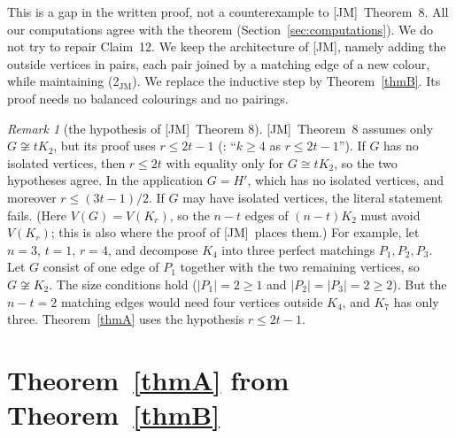 \documentclass[11pt]{amsart}
\theoremstyle{definition}
\theoremstyle{remark}
\newtheorem{remark}[theorem]{Remark}
\newcommand{\JM}{\textup{[JM]}}
\begin{document}
This is a gap in the written proof, not a counterexample to \JM\ Theorem~8. All our
computations agree with the theorem (Section~\ref{sec:computations}). We do not try to repair
Claim~12. We keep the architecture of \JM, namely adding the outside vertices in pairs, each
pair joined by a matching edge of a new colour, while maintaining (2$_{\mathrm{JM}}$). We replace the inductive
step by Theorem~\ref{thmB}. Its proof needs no balanced colourings and no pairings.

\begin{remark}[the hypothesis of \JM\ Theorem 8]\label{rem:hyp}
\JM\ Theorem~8 assumes only $G\not\cong tK_2$, but its proof uses $r\le 2t-1$
(\cite[p.~9]{JM}: ``$k\ge4$ as $r\le 2t-1$''). If $G$ has no isolated vertices, then $r\le 2t$
with equality only for $G\cong tK_2$, so the two hypotheses agree. In the application $G=H'$,
which has no isolated vertices, and moreover $r\le(3t-1)/2$. If $G$ may have isolated vertices,
the literal statement fails. (Here $V(G)=V(K_r)$, so the $n-t$ edges of $(n-t)K_2$ must avoid
$V(K_r)$; this is also where the proof of \JM\ places them.) For example, let $n=3$, $t=1$, $r=4$, and decompose $K_4$ into three
perfect matchings $P_1,P_2,P_3$. Let $G$ consist of one edge of $P_1$ together with the two
remaining vertices, so $G\not\cong K_2$. The size conditions hold ($|P_1|=2\ge1$ and
$|P_2|=|P_3|=2\ge2$). But the $n-t=2$ matching edges would need four vertices outside $K_4$,
and $K_7$ has only three. Theorem~\ref{thmA} uses the hypothesis $r\le 2t-1$.
\end{remark}

\section{Theorem~\ref{thmA} from Theorem~\ref{thmB}}\label{sec:thmA}
\end{document}
